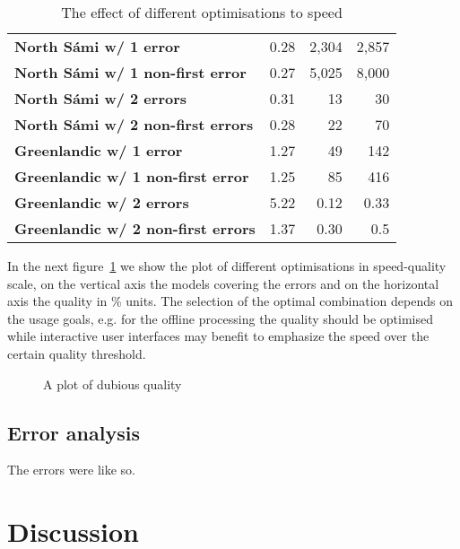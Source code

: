 \documentclass[a4paper,12pt]{article}
\begin{document}
\begin{table}
\begin{tabular}{|l|r|r|r|}
        \bf North Sámi w/ 1 error    & 0.28 & 2,304 & 2,857 \\
\bf North Sámi w/ 1 non-first error  & 0.27 & 5,025 & 8,000 \\
       \bf North Sámi w/ 2 errors    & 0.31 & 13    & 30    \\
\bf North Sámi w/ 2 non-first errors & 0.28 & 22    & 70    \\
        \hline
        \bf Greenlandic w/ 1 error    & 1.27 & 49 & 142 \\
\bf Greenlandic w/ 1 non-first error  & 1.25 & 85 & 416 \\
       \bf Greenlandic w/ 2 errors    & 5.22 & 0.12 & 0.33 \\
\bf Greenlandic w/ 2 non-first errors & 1.37 & 0.30 & 0.5 \\
        \hline
    \end{tabular}
    \caption{The effect of different optimisations to speed
    \label{table:optimisation-speed}}
\end{table}

In the next figure~\ref{fig:optimisation-speed-quality} we show the plot of
different optimisations in speed-quality scale, on the vertical axis the models
covering the errors and on the horizontal axis the quality in \% units. The
selection of the optimal combination depends on the usage goals, e.g. for the
offline processing the quality should be optimised while interactive user
interfaces may benefit to emphasize the speed over the certain quality
threshold.

\begin{figure}
    \centering
    \caption{A plot of dubious quality
    \label{fig:optimisation-speed-quality}}
\end{figure}

\subsection{Error analysis}
\label{subsec:error-analysis}


The errors were like so.

\section{Discussion}
\label{sec:discussion}
\end{document}
